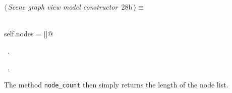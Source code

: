 \documentclass[
    a4paper,      %
    10pt,         %
    openright,    %
    notitlepage,  %
    parskip=half, %
]{scrreprt}       %
\theoremstyle{definition}                    %
\begin{document}
\begin{flushleft} \small
\begin{minipage}{\linewidth}\label{scrap28}\raggedright\small
{} $\langle\,${\itshape Scene graph view model constructor}\nobreak\ {\footnotesize {28b}}$\,\rangle\equiv$
\vspace{-1exm}
\begin{list}{}{} \item
\mbox{}\lstinline@@\\
\mbox{}\lstinline@    self.nodes = []@\\
\mbox{}\lstinline@@{\NWsep}
\end{list}
\vspace{-1.5ex}
\footnotesize
\begin{list}{}{\setlength{\itemsep}{-\parsep}\setlength{\itemindent}{-\leftmargin}}
\item \NWtxtMacroDefBy\ .
\item \NWtxtMacroRefIn\ .

\item{}
\end{list}
\end{minipage}\vspace{4ex}
\end{flushleft}
The method \verb+node_count+ then simply returns the length of the node list.
\end{document}
